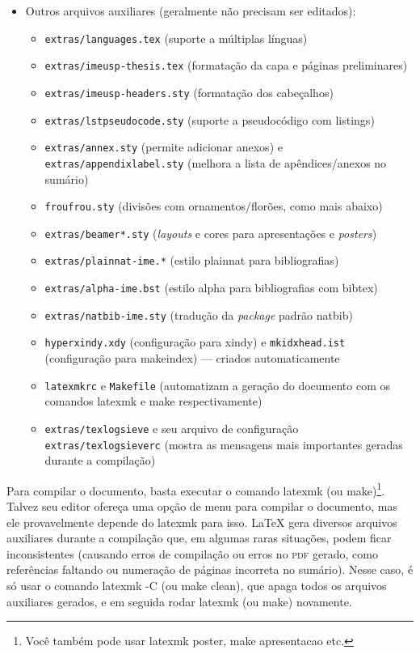\begin{itemize}
  \item Outros arquivos auxiliares (geralmente não precisam ser editados):
  \begin{itemize}
    \item \texttt{extras/languages.tex} (suporte a múltiplas línguas)
    \item \texttt{extras/imeusp-thesis.tex} (formatação da capa e páginas preliminares)
    \item \texttt{extras/imeusp-headers.sty} (formatação dos cabeçalhos)
    \item \texttt{extras/lstpseudocode.sty} (suporte a pseudocódigo com \textsf{listings})
    \item \texttt{extras/annex.sty} (permite adicionar anexos) e
          \texttt{extras/appendixlabel.sty} (melhora a lista de
          apêndices/anexos no sumário)
    \item \texttt{froufrou.sty} (divisões com ornamentos/florões, como mais abaixo)
    \item \texttt{extras/beamer*.sty} (\textit{layouts} e cores para
          apresentações e \textit{posters})
    \item \texttt{extras/plainnat-ime.*} (estilo plainnat para bibliografias)
    \item \texttt{extras/alpha-ime.bst} (estilo alpha para bibliografias com
          bibtex)
    \item \texttt{extras/natbib-ime.sty} (tradução da \textit{package}
          padrão natbib)
    \item \texttt{hyperxindy.xdy} (configuração para xindy) e
          \texttt{mkidxhead.ist} (configuração para makeindex) --- criados automaticamente
    \item \texttt{latexmkrc} e \texttt{Makefile} (automatizam a geração do
          documento com os comandos \textsf{latexmk} e \textsf{make} respectivamente)
    \item \texttt{extras/texlogsieve} e seu arquivo de configuração
          \texttt{extras/texlogsieverc} (mostra as mensagens mais importantes
          geradas durante a compilação)
  \end{itemize}
\end{itemize}

\froufrou

Para compilar o documento, basta executar o comando \textsf{latexmk} (ou
\textsf{make})\footnote{Você também pode usar \textsf{latexmk poster},
\textsf{make apresentacao} etc.}. Talvez seu editor ofereça uma
opção de menu para compilar o documento, mas ele provavelmente depende do
\textsf{latexmk} para isso. \LaTeX{} gera diversos arquivos auxiliares
durante a compilação que, em algumas raras situações, podem ficar
inconsistentes (causando erros de compilação ou erros no \textsc{pdf} gerado,
como referências faltando ou numeração de páginas incorreta no sumário).
Nesse caso, é só usar o comando \textsf{latexmk -C} (ou \textsf{make clean}),
que apaga todos os arquivos auxiliares gerados, e em seguida rodar
\textsf{latexmk} (ou \textsf{make}) novamente.


